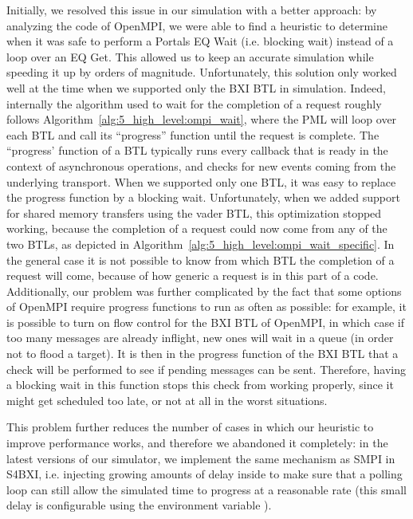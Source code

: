 Initially, we resolved this issue in our simulation with a better approach: by
analyzing the code of OpenMPI, we were able to find a heuristic to determine
when it was safe to perform a Portals EQ Wait (i.e. blocking wait) instead of a
loop over an EQ Get. This allowed us to keep an accurate simulation while
speeding it up by orders of magnitude. Unfortunately, this solution only worked
well at the time when we supported only the BXI BTL in simulation. Indeed,
internally the algorithm used to wait for the completion of a request roughly
follows Algorithm~\ref{alg:5_high_level:ompi_wait}, where the PML will loop over
each BTL and call its ``progress'' function until the request is complete. The
``progress' function of a BTL typically runs every callback that is ready in the
context of asynchronous operations, and checks for new events coming from the
underlying transport. When we supported only one BTL, it was easy to replace the
progress function by a blocking wait. Unfortunately, when we added support for
shared memory transfers using the vader BTL, this optimization stopped working,
because the completion of a request could now come from any of the two BTLs, as
depicted in Algorithm~\ref{alg:5_high_level:ompi_wait_specific}. In the general
case it is not possible to know from which BTL the completion of a request will
come, because of how generic a request is in this part of a code. Additionally,
our problem was further complicated by the fact that some options of OpenMPI
require progress functions to run as often as possible: for example, it is
possible to turn on flow control for the BXI BTL of OpenMPI, in which case if
too many messages are already inflight, new ones will wait in a queue (in order
not to flood a target). It is then in the progress function of the BXI BTL that
a check will be performed to see if pending messages can be sent. Therefore,
having a blocking wait in this function stops this check from working properly,
since it might get scheduled too late, or not at all in the worst situations.

This problem further reduces the number of cases in which our heuristic to
improve performance works, and therefore we abandoned it completely: in the
latest versions of our simulator, we implement the same mechanism as SMPI in
S4BXI, i.e. injecting growing amounts of delay inside  to make
sure that a polling loop can still allow the simulated time to progress at a
reasonable rate (this small delay is configurable using the environment variable
).

